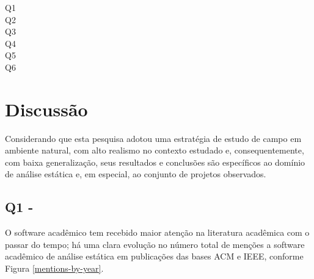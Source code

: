 \begin{description}
  \item [Q1] \QuestaoUm
  \item [Q2] \QuestaoDois
  \item [Q3] \QuestaoTres
  \item [Q4] \QuestaoQuatro
  \item [Q5] \QuestaoCinco
  \item [Q6] \QuestaoSeis
\end{description}

\section{Discussão}
\label{sec:discussao}

Considerando que esta pesquisa adotou uma estratégia de 
estudo de campo em ambiente natural,
com alto realismo no contexto estudado e,
consequentemente, com baixa generalização,
seus resultados e conclusões são específicos 
ao domínio de análise estática e, em especial,
ao conjunto de projetos observados.

\subsection{Q1 - \QuestaoUm} %

O software acadêmico tem recebido maior atenção na literatura acadêmica com o
passar do tempo; há uma clara evolução no número total de menções a software
acadêmico de análise estática em publicações das bases ACM e IEEE, conforme
Figura \ref{mentions-by-year}.

